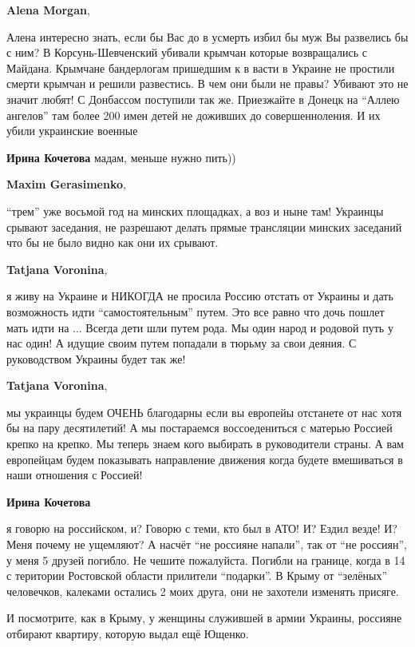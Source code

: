 \begin{itemize}
\begin{itemize}
\textbf{Alena Morgan}, 

Алена интересно знать, если бы Вас до в усмерть избил бы муж Вы развелись бы с
ним? В Корсунь-Шевченский убивали крымчан которые возвращались с Майдана.
Крымчане бандерлогам пришедшим к в васти в Украине не простили смерти крымчан и
решили развестись. В чем они были не правы? Убивают это не значит любят! С
Донбассом поступили так же. Приезжайте в Донецк на \enquote{Аллею ангелов} там более
200 имен детей не доживших до совершенноления. И их убили украинские военные

\textbf{Ирина Кочетова} мадам, меньше нужно пить))

\textbf{Maxim Gerasimenko}, 

\enquote{трем} уже восьмой год на минских площадках, а воз и ныне там! Украинцы срывают
заседания, не разрешают делать прямые трансляции минских заседаний что бы не
было видно как они их срывают.

\textbf{Tatjana Voronina}, 

я живу на Украине и НИКОГДА не просила Россию отстать от Украины и дать
возможность идти \enquote{самостоятельным} путем. Это все равно что дочь пошлет мать
идти на ... Всегда дети шли путем рода. Мы один народ и родовой путь у нас
один! А идущие своим путем попадали в тюрьму за свои деяния. С руководством
Украины будет так же!

\textbf{Tatjana Voronina}, 

мы украинцы будем ОЧЕНЬ благодарны если вы европейы отстанете от нас хотя бы на
пару десятилетий! А мы постараемся воссоедениться с матерью Россией крепко на
крепко. Мы теперь знаем кого выбирать в руководители страны. А вам европейцам
будем показывать направление движения когда будете вмешиваться в наши отношения
с Россией!

\textbf{Ирина Кочетова} 

я говорю на российском, и? Говорю с теми, кто был в АТО! И? Ездил везде! И?
Меня почему не ущемляют? А насчёт \enquote{не россияне напали}, так от \enquote{не россиян},
у меня 5 друзей погибло. Не чешите пожалуйста. Погибли на границе, когда в 14 с
територии Ростовской области прилители \enquote{подарки}. В Крыму от \enquote{зелёных}
человечков, калеками остались 2 моих друга, они не захотели изменять присяге.

И посмотрите, как в Крыму, у женщины служившей в армии Украины, россияне
отбирают квартиру, которую выдал ещё Ющенко.


\end{itemize}
\end{itemize}
